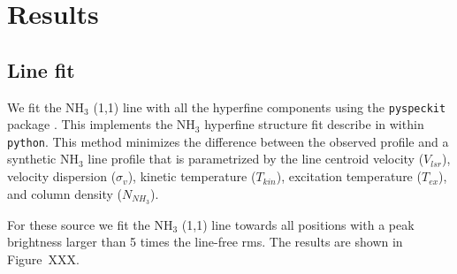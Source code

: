\section{Results}

\subsection{Line fit}
We fit the NH$_3$ (1,1) line with all the hyperfine components using the \verb+pyspeckit+ package \cite{2011ascl.soft09001G}. 
This implements the NH$_3$ hyperfine structure fit describe in \cite{Rosolowsky_2008} within \verb+python+.
This method minimizes the difference between the observed profile and a synthetic NH$_3$ line profile 
that is parametrized by the line centroid velocity ($V_{lsr}$), velocity dispersion ($\sigma_v$), 
kinetic temperature ($T_{kin}$), excitation temperature ($T_{ex}$), and column density ($N_{NH_3}$).

For these source we fit the NH$_3$ (1,1) line towards all positions with a peak brightness larger than
5 times the line-free rms. The results are shown in Figure~XXX.